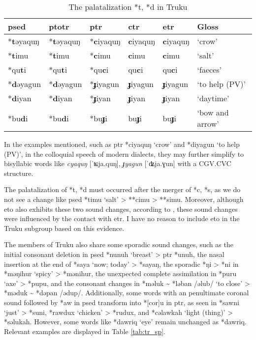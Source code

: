 \begin{table}[!htbp]
\centering
\caption{The palatalization *t, *d in Truku}
\label{tab:trtdpal}
\begin{tabular}{llllll}
\hline
\ac{psed}      & \ac{ptotr}   & \ac{ptr}     & \acs{ctr}   & \acs{etr}   & Gloss               \\ \hline
*\textbf{t}əyaquŋ  & *\textbf{t}əyaquŋ  & *\textbf{c}iyaquŋ  & \textbf{c}iyaquŋ   & \textbf{c}iyaquŋ   & `crow'          \\
*\textbf{t}imu  & *\textbf{t}imu  & *\textbf{c}imu  & \textbf{c}imu   & \textbf{c}imu   & `salt'          \\
*qu\textbf{t}i  & *qu\textbf{t}i  & *qu\textbf{c}i  & qu\textbf{c}i   & qu\textbf{c}i   & `faeces'        \\
*\textbf{d}əyagun & *\textbf{d}əyagun & *\textbf{ɟ}iyagun & \textbf{ɟ}iyagun  & \textbf{ɟ}iyagun  & `to help (PV)'       \\
*\textbf{d}iyan & *\textbf{d}iyan & *\textbf{ɟ}iyan & \textbf{ɟ}iyan  & \textbf{ɟ}iyan  & `daytime'       \\
*bu\textbf{d}i  & *bu\textbf{d}i  & *bu\textbf{ɟ}i  & bu\textbf{ɟ}i   & bu\textbf{ɟ}i   & `bow and arrow' \\ \hline
\end{tabular}
\end{table}

In the examples mentioned, such as \acl{ptr} *ciyaquŋ `crow' and *diyagun `to help (PV)', in the colloquial speech of modern dialects, they may further simplify to bisyllabic words like \textit{cyaquŋ} [ˈʨja.quŋ], \textit{ɟyagun} [ˈʥja.ɣun] with a CGV.CVC structure.

The palatalization of *t, *d must occurred after the merger of *c, *s, as we do not see a change like \acl{psed} *timu `salt' > **cimu > **simu. Moreover, although \acl{eto} also exhibits these two sound changes, according to \textcite{lee2015tawsa}, these sound changes were influenced by the contact with \acl{etr}. I have no reason to include \acl{eto} in the Truku subgroup based on this evidence. 

The members of Truku also share some sporadic sound changes, such as the initial consonant deletion in \acl{psed} *nunuh `breast' > \acl{ptr} *unuh, the nasal insertion at the end of *saya `now; today' > *sayaŋ, the sporadic *ŋi > *ni in *məŋihur `spicy' > *mənihur, the unexpected complete assimilation in *puru `axe' > *pupu, and the consonant changes in *məluk \~{} *ləban /əlub/ `to close' > *məduk \~{} *dəpan /ədup/. Additionally, some words with an penultimate coronal sound followed by *aw in \acl{psed} transform into *[cor]u in \acl{ptr}, as seen in *sawni `just' > *suni, *rawdux `chicken' > *rudux, and *cəlawkah `light (thing)' > *səlukah. However, some words like *dawriq `eye' remain unchanged as *dawriq. Relevant examples are displayed in Table \ref{tab:tr_sp}.

